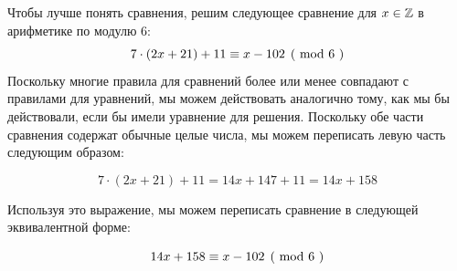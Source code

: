 \begin{example}
\label{example_first_congruence}
Чтобы лучше понять сравнения, решим следующее сравнение для $x\in \mathbb{Z}$ в арифметике по модулю $6$:
$$\kongru{7\cdot(2x+21) + 11}{x-102}{6}$$
Поскольку многие правила для сравнений более или менее совпадают с правилами для уравнений, мы можем действовать аналогично тому, как мы бы действовали, если бы имели уравнение для решения. Поскольку обе части сравнения содержат обычные целые числа, мы можем переписать левую часть следующим образом: 

$$7\cdot(2x+21) + 11 = 14x + 147 + 11 = 14x +158$$

Используя это выражение, мы можем переписать сравнение в следующей эквивалентной форме:

$$\kongru{14x +158}{x-102}{6}$$


\end{example}
